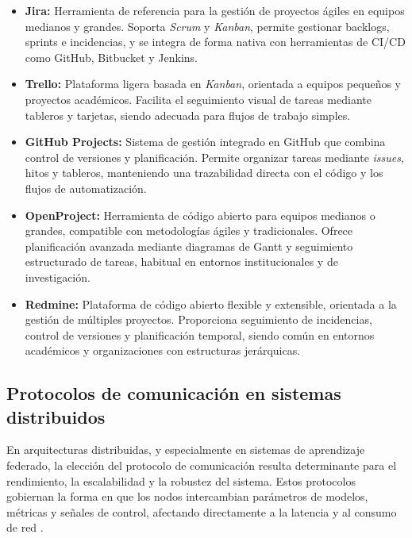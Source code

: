 \documentclass{report}
\begin{document}
\begin{itemize}
    \item \textbf{Jira:}  
    Herramienta de referencia para la gestión de proyectos ágiles en equipos medianos y grandes. Soporta \textit{Scrum} y \textit{Kanban}, permite gestionar backlogs, sprints e incidencias, y se integra de forma nativa con herramientas de CI/CD como GitHub, Bitbucket y Jenkins.

    \item \textbf{Trello:}  
    Plataforma ligera basada en \textit{Kanban}, orientada a equipos pequeños y proyectos académicos. Facilita el seguimiento visual de tareas mediante tableros y tarjetas, siendo adecuada para flujos de trabajo simples.

    \item \textbf{GitHub Projects:}  
    Sistema de gestión integrado en GitHub que combina control de versiones y planificación. Permite organizar tareas mediante \textit{issues}, hitos y tableros, manteniendo una trazabilidad directa con el código y los flujos de automatización.

    \item \textbf{OpenProject:}  
    Herramienta de código abierto para equipos medianos o grandes, compatible con metodologías ágiles y tradicionales. Ofrece planificación avanzada mediante diagramas de Gantt y seguimiento estructurado de tareas, habitual en entornos institucionales y de investigación.

    \item \textbf{Redmine:}  
    Plataforma de código abierto flexible y extensible, orientada a la gestión de múltiples proyectos. Proporciona seguimiento de incidencias, control de versiones y planificación temporal, siendo común en entornos académicos y organizaciones con estructuras jerárquicas.
\end{itemize}


\subsection{Protocolos de comunicación en sistemas distribuidos}
\label{sec:protocolos}

En arquitecturas distribuidas, y especialmente en sistemas de aprendizaje federado, la elección del protocolo de comunicación resulta determinante para el rendimiento, la escalabilidad y la robustez del sistema. Estos protocolos gobiernan la forma en que los nodos intercambian parámetros de modelos, métricas y señales de control, afectando directamente a la latencia y al consumo de red \cite{tanenbaum2017distributed}.
\end{document}
